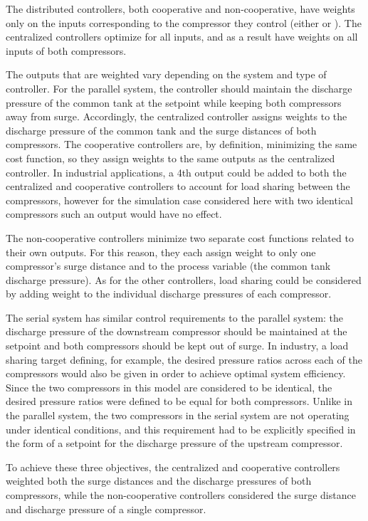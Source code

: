The distributed controllers, both cooperative and non-cooperative, have weights only on the inputs corresponding to the compressor they control (either  or ).
The centralized controllers optimize for all inputs, and as a result have weights on all inputs of both compressors.

The outputs that are weighted vary depending on the system and type of controller.
For the parallel system, the controller should maintain the discharge pressure of the common tank at the setpoint while keeping both compressors away from surge.
Accordingly, the centralized controller assigns weights to the discharge pressure of the common tank and the surge distances of both compressors.
The cooperative controllers are, by definition, minimizing the same cost function, so they assign weights to the same outputs as the centralized controller.
In industrial applications, a 4th output could be added to both the centralized and cooperative controllers to account for load sharing between the compressors, however for the simulation case considered here with two identical compressors such an output would have no effect. 

The non-cooperative controllers minimize two separate cost functions related to their own outputs.
For this reason, they each assign weight to only one compressor's surge distance and to the process variable (the common tank discharge pressure).
As for the other controllers, load sharing could be considered by adding weight to the individual discharge pressures of each compressor. 

The serial system has similar control requirements to the parallel system: the discharge pressure of the downstream compressor should be maintained at the setpoint and both compressors should be kept out of surge.
In industry, a load sharing target defining, for example, the desired pressure ratios across each of the compressors would also be given in order to achieve optimal system efficiency.
Since the two compressors in this model are considered to be identical, the desired pressure ratios were defined to be equal for both compressors.
Unlike in the parallel system, the two compressors in the serial system are not operating under identical conditions, and this requirement had to be explicitly specified in the form of a setpoint for the discharge pressure of the upstream compressor.

To achieve these three objectives, the centralized and cooperative controllers weighted both the surge distances and the discharge pressures of both compressors, while the non-cooperative controllers considered the surge distance and discharge pressure of a single compressor.

